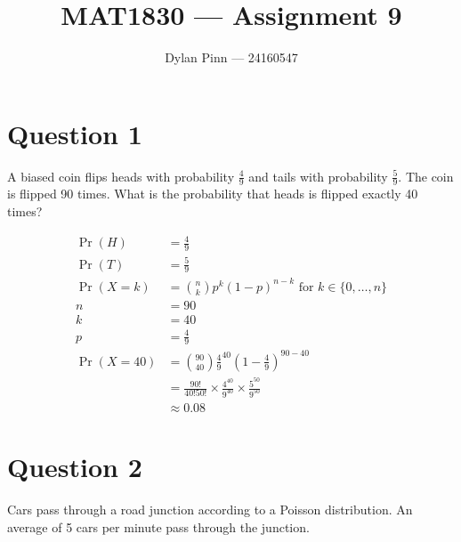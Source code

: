 \documentclass[11pt]{article}
\begin{document}
\title{MAT1830 --- Assignment 9}
\author{Dylan Pinn --- 24160547}
\maketitle

\section*{Question 1}

A biased coin flips heads with probability $\frac{4}{9}$ and tails with
probability $\frac{5}{9}$. The coin is flipped 90 times. What is the probability
that heads is flipped exactly 40 times?

\begin{align*}
  \Pr(H) &= \frac{4}{9} \\
  \Pr(T) &= \frac{5}{9} \\
  \Pr(X = k) &= \binom{n}{k} p^k {(1-p)}^{n-k} \text{ for } k \in \{ 0,
    \dots, n \} \\
  n &= 90 \\
  k &= 40 \\
  p &= \frac{4}{9} \\
  \Pr(X = 40) &= \binom{90}{40} {\frac{4}{9}}^{40} {(1-\frac{4}{9})}^{90-40} \\
  &= \frac{90!}{40!50!} \times \frac{4^{40}}{9^{40}} \times
  \frac{5^{50}}{9^{50}} \\
  &\approx 0.08
\end{align*}

\break{}

\section*{Question 2}

Cars pass through a road junction according to a Poisson distribution. An
average of 5 cars per minute pass through the junction.
\end{document}
